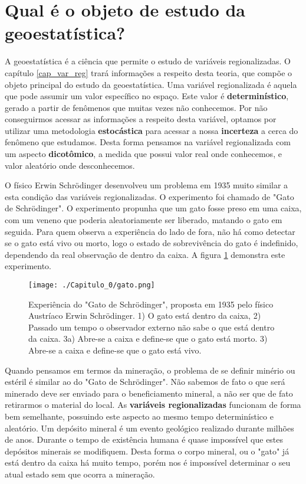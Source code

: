  \section{Qual é o objeto de estudo da geoestatística?}
 
 A geoestatística é a ciência que permite o estudo de variáveis regionalizadas. O capítulo \ref{cap_var_reg} trará informações a respeito desta teoria, que compõe o objeto principal do estudo da geoestatística. Uma variável regionalizada é aquela que pode assumir um valor específico no espaço. Este valor é \textbf{determinístico}, gerado a partir de fenômenos que muitas vezes não conhecemos. Por não conseguirmos acessar as informações a respeito desta variável, optamos por utilizar uma metodologia \textbf{estocástica} para acessar a nossa \textbf{incerteza} a cerca do fenômeno que estudamos. Desta forma pensamos na variável regionalizada com um aspecto \textbf{dicotômico}, a medida que possui valor real onde conhecemos, e valor aleatório onde desconhecemos. 
 
 O físico Erwin Schrödinger desenvolveu um problema em 1935 muito similar a esta condição das variáveis regionalizadas. O experimento foi chamado de "Gato de Schrödinger". O experimento propunha que um gato fosse preso em uma caixa, com um veneno que poderia aleatoriamente ser liberado, matando o gato em seguida. Para quem observa a experiência do lado de fora, não há como detectar se o gato está vivo ou morto, logo o estado de sobrevivência do gato é indefinido, dependendo da real observação de dentro da caixa. A figura \ref{gato} demonstra este experimento. 
 
 
 \FloatBarrier
 \begin{figure}[!htb]
 	\centering
 	\texttt{[image: ./Capitulo\_0/gato.png]}	
 	\caption{Experiência do "Gato de Schrödinger", proposta em 1935 pelo físico Austríaco Erwin Schrödinger. 1) O gato está dentro da caixa, 2) Passado um tempo o observador externo não sabe o que está dentro da caixa. 3a) Abre-se a caixa e define-se que o gato está morto. 3) Abre-se a caixa e define-se que o gato está vivo.  }
 	\label{gato}
 \end{figure}
 \FloatBarrier
 
 Quando pensamos em termos da mineração, o problema de se definir minério ou estéril é similar ao do "Gato de Schrödinger". Não sabemos de fato o que será minerado deve ser enviado para o beneficiamento mineral, a não ser que de fato retirarmos o material do local. As \textbf{variáveis regionalizadas} funcionam de forma bem semelhante, possuindo este aspecto ao mesmo tempo determinístico e aleatório. Um depósito mineral é um evento geológico realizado durante milhões de anos. Durante o tempo de existência humana é quase impossível que estes depósitos minerais se modifiquem. Desta forma o corpo mineral, ou o "gato" já está dentro da caixa há muito tempo, porém nos é impossível determinar o seu atual estado sem que ocorra a mineração. 
 
